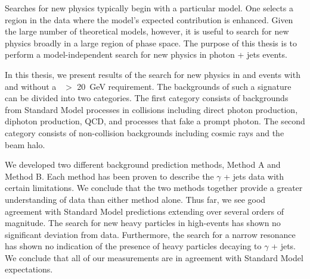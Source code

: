 \vspace{0.015\textheight}
Searches for new physics typically begin with a particular model. One selects a region in the data where the model's expected contribution is enhanced. Given the large number of theoretical models, however, it is useful to search for new physics broadly in a large region of phase space.  The purpose of this thesis is to perform a model-independent search for new physics in photon + jets events.


In this thesis, we present results of the search for new physics in \phoonejet and \photwojet events with and without a \met~$>$ 20~GeV requirement. The backgrounds of such a signature can be divided into two categories. The first category consists of backgrounds from Standard Model processes in \ppbar collisions including direct photon production, diphoton production, QCD, and processes that fake a prompt photon. The second category consists of non-collision backgrounds including cosmic rays and the beam halo.

We developed two different background prediction methods, Method A and Method B. Each method has been proven to describe the $\gamma$ + jets data with certain limitations. We conclude that the two methods together provide a greater understanding of data than either method alone. Thus far, we see good agreement with Standard Model predictions extending over several orders of magnitude. The search for new heavy particles in high-\et events has shown no significant deviation from data. Furthermore, the search for a narrow resonance has shown no indication of the presence of heavy particles decaying to $\gamma$ + jets. We conclude that all of our measurements are in agreement with Standard Model expectations.

